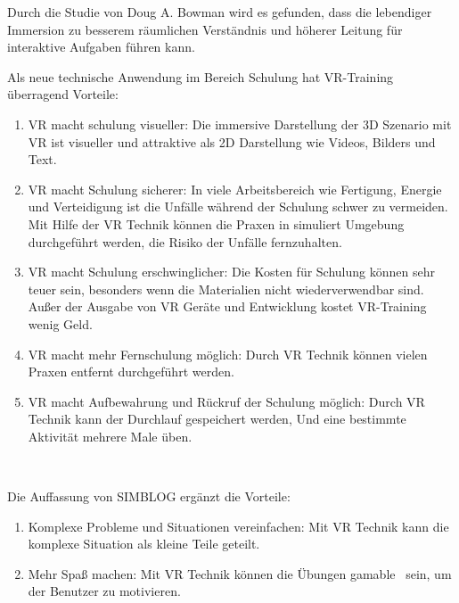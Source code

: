 Durch die Studie von Doug A. Bowman wird es gefunden, dass die lebendiger Immersion zu besserem räumlichen Verständnis und höherer Leitung für interaktive Aufgaben führen kann. \citep{27}


Als neue technische Anwendung im Bereich Schulung hat VR-Training überragend Vorteile\citep{15}:

\begin{enumerate}
\item VR macht schulung visueller: Die immersive Darstellung der 3D Szenario mit VR ist visueller und attraktive als 2D Darstellung wie Videos, Bilders und Text.
\item VR macht Schulung sicherer: In viele Arbeitsbereich wie Fertigung, Energie und Verteidigung ist die Unfälle während der Schulung schwer zu vermeiden. Mit Hilfe der VR Technik können die Praxen in simuliert Umgebung durchgeführt werden, die Risiko der Unfälle fernzuhalten.
\item VR macht Schulung erschwinglicher: Die Kosten für Schulung können sehr teuer sein, besonders wenn die Materialien nicht wiederverwendbar sind. Außer der Ausgabe von VR Geräte und Entwicklung kostet VR-Training wenig Geld.
\item VR macht mehr Fernschulung möglich: Durch VR Technik können vielen Praxen entfernt durchgeführt werden.
\item VR macht Aufbewahrung und Rückruf der Schulung möglich: Durch VR Technik kann der Durchlauf gespeichert werden, Und eine bestimmte Aktivität mehrere Male üben.
\end{enumerate}\

Die Auffassung von SIMBLOG\citep{16} ergänzt die Vorteile:

\begin{enumerate}
\item Komplexe Probleme und Situationen vereinfachen: Mit VR Technik kann die komplexe Situation als kleine Teile geteilt.
\item Mehr Spaß machen: Mit VR Technik können die Übungen \glqq gamable \grqq\ sein, um der Benutzer zu motivieren. 
\end{enumerate}\

